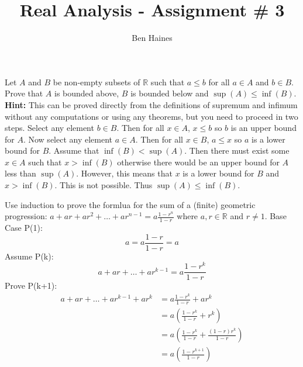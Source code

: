 \documentclass[paper=a4, fontsize=11pt]{jhwhw} %
\begin{document}
\title{Real Analysis - Assignment \# 3}
\author{Ben Haines}

Let $A$ and $B$ be non-empty subsets of $\mathbb R$ such that $a\le b$ for all $a\in A$ and $b\in B$. Prove that $A$ is bounded above, $B$ is bounded below and $\sup(A)\le \inf(B)$. \textbf{Hint: }This can be proved directly from the definitions of supremum and infimum without any computations or using any theorems, but you need to proceed in two steps.
\solution
Select any element $b\in B$. Then for all $x\in A$, $x\le b$ so $b$ is an upper bound for $A$. Now select any element $a\in A$. Then for all $x\in B$, $a \le x$ so $a$ is a lower bound for $B$. Assume that $\inf(B) < \sup(A)$. Then there must exist some $x\in A$ such that $x> \inf(B)$ otherwise there would be an upper bound for $A$ less than $\sup(A)$. However, this means that $x$ is a lower bound for $B$ and $x > \inf(B)$. This is not possible. Thus $\sup(A) \le \inf(B)$. 

Use induction to prove the formlua for the sum of a (finite) geometric progression: $a + ar + ar^2 + \ldots + ar^{n-1} = a\frac{1-r^n}{1-r}$ where $a,r \in \mathbb R$ and $r\not= 1$.
\solution
Base Case P(1):
$$a = a\frac{1-r}{1-r} = a$$
Assume P(k):
$$a + ar + \ldots + ar^{k-1} = a\frac{1-r^k}{1-r}$$
Prove P(k+1):
\begin{align*}
    a + ar + \ldots + ar^{k-1} + ar^k &= a\frac{1-r^k}{1-r} + ar^k\\
                                      &= a\left(\frac{1-r^k}{1-r} + r^k\right)\\
                                      &= a\left(\frac{1-r^k}{1-r} + \frac{(1-r)r^k}{1-r}\right)\\
                                      &= a\left(\frac{1-r^{k+1}}{1-r}\right)
\end{align*}
\end{document}
